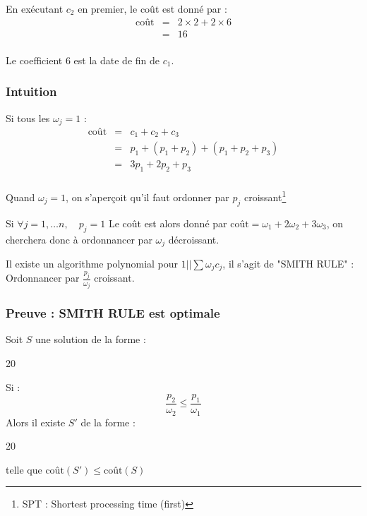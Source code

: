 \documentclass[a4paper, 11pt]{thesis}
\newcommand{\openord}[1]{\begin{center}\begin{ganttchart}[hgrid=true,vgrid={{dotted}},inline]{#1}
    \gantttitlelist{1,...,#1}{1}\\}
\newcommand{\closeord}{\end{ganttchart}\end{center}}
\begin{document}
En exécutant $c_2$ en premier, le coût est donné par : \begin{displaymath}
\begin{array}{rcl}
    \mbox{coût} & = & 2 \times 2  + 2 \times 6\\
                & = &  16\\
\end{array} \end{displaymath}

Le coefficient $6$ est la date de fin de $c_1$.

\subsubsection*{Intuition}
Si tous les $\omega_j = 1$ :
\begin{displaymath}\begin{array}{rcl}
    \mbox{coût} & = & c_1 + c_2 + c_3 \\
                & = & p_1 + (p_1 + p_2) + (p_1 + p_2 + p_3) \\
                & = & 3p_1 + 2p_2 + p_3 \\
\end{array} \end{displaymath}

Quand $\omega_j = 1$, on s'aperçoit qu'il faut ordonner par $p_j$ croissant\footnote{SPT : Shortest
processing time (first)}

Si $\forall j=1, \dots n,\quad p_j = 1$ 
Le coût est alors donné par $\mbox{coût} = \omega_1 + 2\omega_2 + 3\omega_3$, on cherchera donc à
ordonnancer par $\omega_j$ décroissant.

Il existe un algorithme polynomial pour $1 | | \sum\omega_jc_j$, il s'agit de "SMITH RULE" :\\
Ordonnancer par $\frac{p_j}{\omega_j}$ croissant.

\subsubsection*{Preuve : SMITH RULE est optimale}

\begin{lemma}
    Soit $S$ une solution de la forme :

    \openord{20}
    \closeord

    Si : \begin{displaymath}
    \frac{p_2}{\omega_2} \leq \frac{p_1}{\omega_1} \end{displaymath}
    Alors il existe $S'$ de la forme : 

    \openord{20}
    \closeord 

    telle que $\mbox{coût}(S') \leq \mbox{coût}(S)$
\end{lemma}
\end{document}
